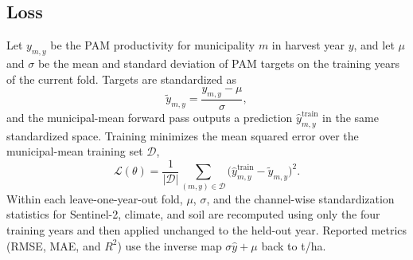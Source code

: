 \subsection{Loss}
\label{sec:loss}
Let $y_{m,y}$ be the PAM productivity for municipality $m$ in harvest year $y$, and let $\mu$ and $\sigma$ be the mean and standard deviation of PAM targets on the training years of the current fold.
Targets are standardized as
\begin{equation}
  \tilde{y}_{m,y}
  =
  \frac{y_{m,y}-\mu}{\sigma},
  \label{eq:target-standardize}
\end{equation}
and the municipal-mean forward pass outputs a prediction $\hat{y}_{m,y}^{\mathrm{train}}$ in the same standardized space.
Training minimizes the mean squared error over the municipal-mean training set $\mathcal{D}$,
\begin{equation}
  \mathcal{L}(\theta)
  =
  \frac{1}{|\mathcal{D}|}
  \sum_{(m,y)\in\mathcal{D}}
  \bigl(\hat{y}_{m,y}^{\mathrm{train}}-\tilde{y}_{m,y}\bigr)^2.
  \label{eq:mse-loss}
\end{equation}
Within each leave-one-year-out fold, $\mu$, $\sigma$, and the channel-wise standardization statistics for Sentinel-2, climate, and soil are recomputed using only the four training years and then applied unchanged to the held-out year.
Reported metrics (RMSE, MAE, and $R^2$) use the inverse map $\sigma\hat{y}+\mu$ back to \si{t/ha}.
